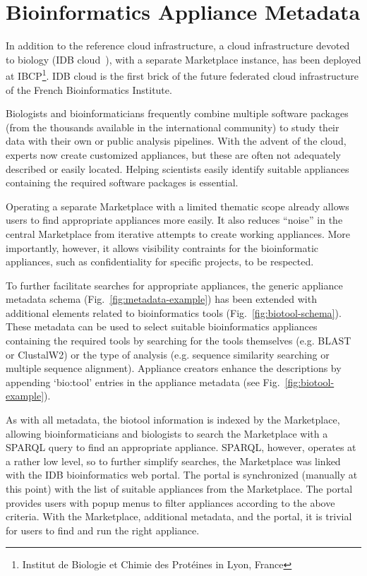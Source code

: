 \section{Bioinformatics Appliance Metadata}
\label{sec:bioinfo}

In addition to the reference cloud infrastructure, a cloud
infrastructure devoted to biology (IDB cloud~\cite{idbcloud}), with a
separate Marketplace instance, has been deployed at
IBCP\footnote{Institut de Biologie et Chimie des Prot\'eines in Lyon,
  France}. IDB cloud is the first brick of the future federated cloud infrastructure of the French Bioinformatics Institute.

Biologists and bioinformaticians frequently combine multiple software
packages (from the thousands available in the international community)
to study their data with their own or public analysis pipelines. With
the advent of the cloud, experts now create customized appliances, but
these are often not adequately described or easily located.  Helping
scientists easily identify suitable appliances containing the required
software packages is essential.

Operating a separate Marketplace with a limited thematic scope already
allows users to find appropriate appliances more easily.  It also
reduces ``noise'' in the central Marketplace from iterative attempts
to create working appliances.  More importantly, however, it allows
visibility contraints for the bioinformatic appliances, such as
confidentiality for specific projects, to be respected.

To further facilitate searches for appropriate appliances,
the generic appliance metadata schema 
(Fig.~\ref{fig:metadata-example}) has been extended with additional elements related to
bioinformatics tools (Fig.~\ref{fig:biotool-schema})\@. These metadata
can be used to select suitable bioinformatics appliances containing
the required tools by searching for the tools themselves (e.g. BLAST or
ClustalW2) or the type of analysis (e.g. sequence similarity searching or
multiple sequence alignment).  Appliance creators enhance the
descriptions by appending `bio:tool' entries in the appliance metadata
(see Fig.~\ref{fig:biotool-example}).

As with all metadata, the biotool information is indexed by the
Marketplace, allowing bioinformaticians and biologists to search the
Marketplace with a SPARQL query to find an appropriate appliance.
SPARQL, however, operates at a rather low level, so to further
simplify searches, the Marketplace was linked with the IDB
bioinformatics web portal.  The portal is synchronized (manually at
this point) with the list of suitable appliances from the Marketplace\@. The
portal provides users with popup menus to filter appliances according
to the above criteria.  With the Marketplace, additional metadata, and
the portal, it is trivial for users to find and run the right
appliance.

